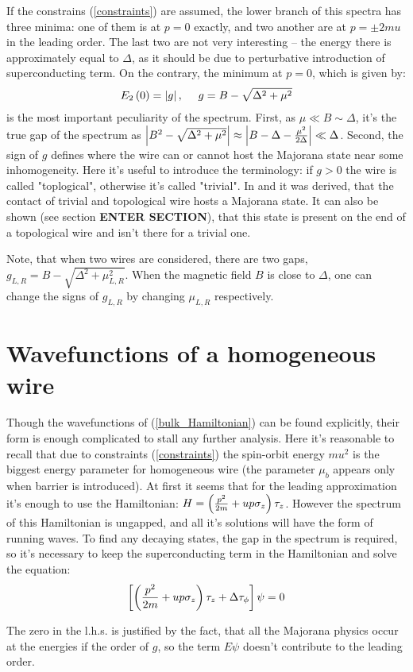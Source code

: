 If the constrains (\ref{constraints}) are assumed, the lower branch of this spectra has three minima: one of them is at $ p=0 $ exactly, and two another are at $ p = \pm 2mu $ in the leading order. The last two are not very interesting -- the energy there is approximately equal to $ \Delta $, as it should be due to perturbative introduction of superconducting term. On the contrary, the minimum at $ p=0 $, which is given by\cite{Oreg_2010}:
\begin{gather}
	E_2\left(0\right)=\left|g\right|,~~~~g = B -\sqrt{\Delta^2+\mu^2}
\end{gather}
is the most important peculiarity of the spectrum. First, as $\mu\ll B \sim \Delta $, it's the true gap of the spectrum as $  \left|B^2 -\sqrt{\Delta^2+\mu^2}\right| \approx  \left|B-\Delta -\frac{\mu^2}{2\Delta}\right|\ll\Delta$. Second, the  sign of  $ g $ defines where the wire can or cannot host the Majorana state near some inhomogeneity. Here it's useful to introduce the terminology: if $ g>0 $ the wire is called "toplogical", otherwise it's called "trivial". In \cite{Oreg_2010} and \cite{Lutchyn_2010} it was derived, that the contact of trivial and topological wire hosts a Majorana state. It can also be shown (see section \textbf{ENTER SECTION}), that this state is present on the end of a topological wire and isn't there for a trivial one.

Note, that when two wires are considered, there are two gaps, $ g_{L,R} = B-\sqrt{\Delta^2+\mu_{L,R}^2} $. When the magnetic field $ B $ is close to $ \Delta $, one can change the signs of $ g_{L,R} $ by changing $ \mu_{L,R} $ respectively. 
\section{Wavefunctions of a homogeneous wire}

Though the wavefunctions of (\ref{bulk_Hamiltonian}) can be found explicitly, their form is enough complicated to stall any further analysis. Here it's reasonable  to recall that due to constraints (\ref{constraints}) the spin-orbit energy $ mu^2 $ is the biggest energy parameter for homogeneous wire (the parameter $ \mu_b $ appears only when barrier is introduced). At first it seems that for the leading approximation it's enough to use the Hamiltonian: $ 	H
=
\left(
\frac{p^2}{2m}
+
u p \sigma_z \right)\tau_z $. However the spectrum of this Hamiltonian is ungapped, and all it's solutions will have the form of running waves. To find any decaying states, the gap in the spectrum is required, so it's necessary to keep the superconducting term in the Hamiltonian and solve the equation:
\begin{gather}
\left[
\left(
\frac{p^2}{2m}
+
u p \sigma_z\right) \tau_z
+
\Delta
\tau_\phi
\right]
\psi
=
0
\end{gather}

The zero in the l.h.s. is justified by the fact, that all the Majorana physics occur at the energies if the order of $ g $, so the term $ E\psi $ doesn't contribute to the leading order.
\fi